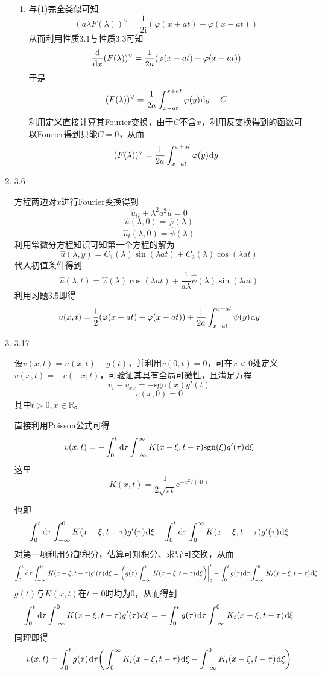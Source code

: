 \documentclass[a4paper,UTF8,fontset=windows,10pt]{ctexart}
\newcommand*{\dr}{\hspace{0.07em}\mathrm{d}}
\newcommand*{\er}{\mathrm{e}}
\newcommand*{\ir}{\mathrm{i}}
\begin{document}
\begin{enumerate}
\begin{enumerate}[(1)]
        \item 与(1)完全类似可知
        $$(a\lambda F(\lambda))^\vee=\frac{1}{2\ir}(\varphi(x+at)-\varphi(x-at))$$
        从而利用性质3.1与性质3.3可知
        $$\frac{\dr}{\dr x}(F(\lambda))^\vee=\frac{1}{2a}(\varphi(x+at)-\varphi(x-at))$$
        于是
        $$(F(\lambda))^\vee=\frac{1}{2a}\int_{x-at}^{x+at}\varphi(y)\dr y+C$$
        利用定义直接计算其Fourier变换，由于$C$不含$x$，利用反变换得到的函数可以Fourier得到只能$C=0$，从而
        $$(F(\lambda))^\vee=\frac{1}{2a}\int_{x-at}^{x+at}\varphi(y)\dr y$$
    \end{enumerate}
    
    \item 3.6
    
    方程两边对$x$进行Fourier变换得到
    $$\hat{u}_{tt}+\lambda^2a^2\hat{u}=0$$
    $$\hat{u}(\lambda,0)=\hat{\varphi}(\lambda)$$
    $$\hat{u}_t(\lambda,0)=\hat{\psi}(\lambda)$$
    利用常微分方程知识可知第一个方程的解为
    $$\hat{u}(\lambda,y)=C_1(\lambda)\sin(\lambda at)+C_2(\lambda)\cos(\lambda at)$$
    代入初值条件得到
    $$\hat{u}(\lambda,t)=\hat{\varphi}(\lambda)\cos(\lambda at)+\frac{1}{a\lambda}\hat{\psi}(\lambda)\sin(\lambda at)$$
    利用习题3.5即得
    $$u(x,t)=\frac{1}{2}(\varphi(x+at)+\varphi(x-at))+\frac{1}{2a}\int_{x-at}^{x+at}\psi(y)\dr y$$
    
    \item 3.17
    
    设$v(x,t)=u(x,t)-g(t)$，并利用$v(0,t)=0$，可在$x<0$处定义$v(x,t)=-v(-x,t)$，可验证其具有全局可微性，且满足方程
    $$v_t-v_{xx}=-\mathrm{sgn}(x)g'(t)$$
    $$v(x,0)=0$$
    其中$t>0,x\in\mathbb{R}$。
    
    直接利用Poisson公式可得
    $$v(x,t)=-\int_0^t\dr\tau\int_{-\infty}^\infty K(x-\xi,t-\tau)\mathrm{sgn}(\xi)g'(\tau)\dr\xi$$
    这里
    $$K(x,t)=\frac{1}{2\sqrt{\pi t}}\er^{-x^2/(4t)}$$
    
    也即
    $$\int_0^t\dr\tau\int_{-\infty}^0 K(x-\xi,t-\tau)g'(\tau)\dr\xi-\int_0^t\dr\tau\int_0^\infty K(x-\xi,t-\tau)g'(\tau)\dr\xi$$
    对第一项利用分部积分，估算可知积分、求导可交换，从而
    $$\int_0^t\dr\tau\int_{-\infty}^0 K(x-\xi,t-\tau)g'(\tau)\dr\xi=\bigg(g(\tau)\int_{-\infty}^0K(x-\xi,t-\tau)\dr\xi\bigg)\bigg|^t_0-\int_0^tg(\tau)\dr\tau\int_{-\infty}^0K_t(x-\xi,t-\tau)\dr\xi$$
    $g(t)$与$K(x,t)$在$t=0$时均为0，从而得到
    $$\int_0^t\dr\tau\int_{-\infty}^0 K(x-\xi,t-\tau)g'(\tau)\dr\xi=-\int_0^tg(\tau)\dr\tau\int_{-\infty}^0K_t(x-\xi,t-\tau)\dr\xi$$
    同理即得
    $$v(x,t)=\int_0^tg(\tau)\dr\tau\bigg(\int_0^\infty K_t(x-\xi,t-\tau)\dr\xi-\int_{-\infty}^0 K_t(x-\xi,t-\tau)\dr\xi\bigg)$$
    

\end{enumerate}
\end{document}
